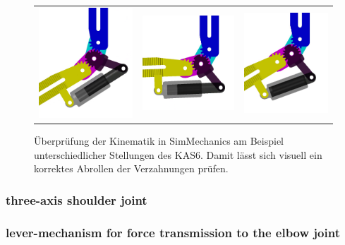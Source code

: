 \documentclass[letterpaper, 10 pt, conference]{ieeeconf}  %
\begin{document}
\begin{figure}[tb!]
    \begin{tabular}{c c c}
        \includegraphics[width=0.28\linewidth]{figures/KAS6m3_SimMech_1.png} &
        \includegraphics[width=0.30\linewidth]{figures/KAS6m3_SimMech_2.png} &
        \includegraphics[width=0.28\linewidth]{figures/KAS6m3_SimMech_3.png}
    \end{tabular}

    \caption[Überprüfung der Kinematik in SimMechanics]{Überprüfung der Kinematik in SimMechanics am Beispiel unterschiedlicher Stellungen des KAS6. Damit lässt sich visuell ein korrektes Abrollen der Verzahnungen prüfen.}
    \label{fig:EllenbogenSimMech}
\end{figure} 

\subsubsection{three-axis shoulder joint}

\subsubsection{lever-mechanism for force transmission to the elbow joint}
\end{document}
